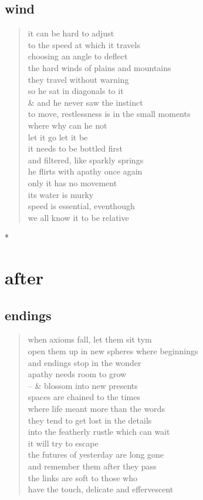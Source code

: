 \documentclass[11pt]{article}
\begin{document}
\subsection{wind}
\label{sec:orgcb850c5}
\begin{verse}
it can be hard to adjust\\
to the speed at which it travels\\
choosing an angle to deflect\\
the hard winds of plains and mountains\\
they travel without warning\\
\vspace*{1em}
so he sat in diagonals to it\\
\& and he never saw the instinct\\
to move, restlessness is in the small moments\\
where why can he not\\
let it go let it be\\
\vspace*{1em}
it needs to be bottled first\\
and filtered, like sparkly springs\\
he flirts with apathy once again\\
only it has no movement\\
its water is murky\\
speed is essential, eventhough\\
we all know it to be relative\\
\end{verse}
*
\section{after}
\label{sec:org807de92}
\subsection{endings}
\label{sec:orgc28da3d}
\begin{verse}
when axioms fall,  let them sit tym\\
open them up in new spheres where beginnings\\
and endings stop in the wonder\\
apathy needs room to grow\\
-- \& blossom into new presents\\
\vspace*{1em}
spaces are chained to the times\\
where life meant more than the words\\
they tend to get lost in the details\\
into the featherly rustle which can wait\\
it will try to escape\\
\vspace*{1em}
the futures of yesterday are long gone\\
and remember them after they pass\\
the links are soft to those who\\
have the touch, delicate and effervescent\\
\end{verse}
\end{document}
